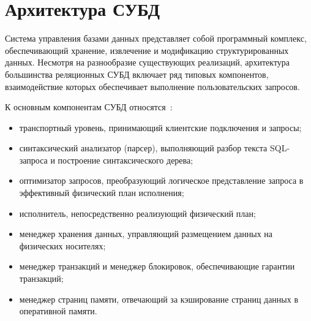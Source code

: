 \documentclass[fontsize=14pt, russian]{scrartcl}
\begin{document}
\section{Архитектура СУБД}

Система управления базами данных представляет собой программный комплекс,
обеспечивающий хранение, извлечение и модификацию структурированных
данных. Несмотря на разнообразие существующих реализаций, архитектура
большинства реляционных СУБД включает ряд типовых компонентов,
взаимодействие которых обеспечивает выполнение пользовательских запросов.

К основным компонентам СУБД относятся~:

\begin{itemize}
    \item транспортный уровень, принимающий клиентские подключения и запросы;
    \item синтаксический анализатор (парсер), выполняющий разбор текста
SQL-запроса и построение синтаксического дерева;
    \item оптимизатор запросов, преобразующий логическое представление запроса в
эффективный физический план исполнения;
    \item исполнитель, непосредственно реализующий физический план;
    \item менеджер хранения данных, управляющий размещением данных на физических
носителях;
    \item менеджер транзакций и менеджер блокировок, обеспечивающие гарантии
транзакций;
    \item менеджер страниц памяти, отвечающий за кэширование страниц данных в
оперативной памяти.
\end{itemize}
\end{document}

